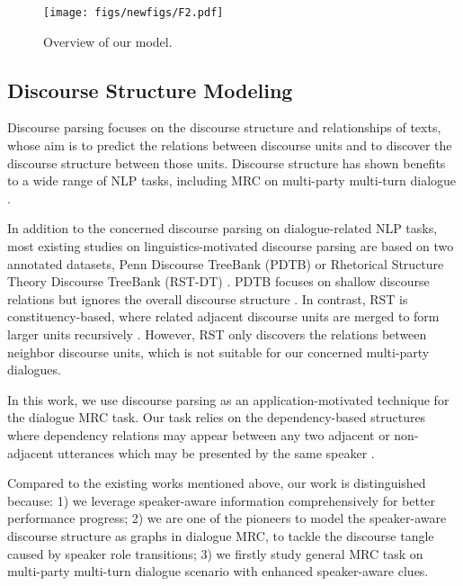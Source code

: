 \documentclass[letterpaper]{article} \usepackage{stylefile}  \usepackage{times}  \usepackage{helvet}  \usepackage{courier}  \usepackage[hyphens]{url}  \usepackage{graphicx} \urlstyle{rm} \def\UrlFont{\rm}  \usepackage{natbib}  \usepackage{caption} \DeclareCaptionStyle{ruled}{labelfont=normalfont,labelsep=colon,strut=off} \frenchspacing  \setlength{\pdfpagewidth}{8.5in}  \setlength{\pdfpageheight}{11in}  \usepackage{algorithm}
\begin{document}
\begin{figure*}[htb]
	\centering
	\texttt{[image: figs/newfigs/F2.pdf]}
	\caption{Overview of our model.}
	\label{overview}
\end{figure*}
\subsection{Discourse Structure Modeling}
Discourse parsing focuses on the discourse structure and relationships of texts, whose aim is to predict the relations between discourse units and to discover the discourse structure between those units. Discourse structure has shown benefits to a wide range of NLP tasks, including MRC on multi-party multi-turn dialogue \cite{asher2016discourse,xu-etal-2021-discovering,ouyang-etal-2021-dialogue,takanobu2018weakly,gao2020discern,jia2020multi}.

In addition to the concerned discourse parsing on dialogue-related NLP tasks, most existing studies on linguistics-motivated discourse parsing are based on two annotated datasets, Penn Discourse TreeBank (PDTB) \cite{prasad2008penn} or Rhetorical Structure Theory Discourse TreeBank (RST-DT) \cite{mann1988rhetorical}. 
PDTB focuses on shallow discourse relations but ignores the overall discourse structure \cite{qin2017adversarial,cai2017pair,bai2018deep,yang2018scidtb}.
In contrast, RST is constituency-based, where related adjacent discourse units are merged to form larger units recursively \cite{braud2017cross,wang2017two,yu2018transition,jotyetal-2015-codra,li2016discourse,liu2017learning}. However, RST only discovers the relations between neighbor discourse units, which is not suitable for our concerned multi-party dialogues. 

In this work, we use discourse parsing as an application-motivated technique for the dialogue MRC task. Our task relies on the dependency-based structures where dependency relations may appear between any two adjacent or non-adjacent utterances which may be presented by the same speaker \cite{shi2019deep,li2020molweni}. 



Compared to the existing works mentioned above, our work is distinguished because:
1) we leverage speaker-aware information comprehensively for better performance progress; 
2) we are one of the pioneers to model the speaker-aware discourse structure as graphs in dialogue MRC, to tackle the discourse tangle caused by speaker role transitions;
3) we firstly study general MRC task on multi-party multi-turn dialogue scenario with enhanced speaker-aware clues.
\end{document}
